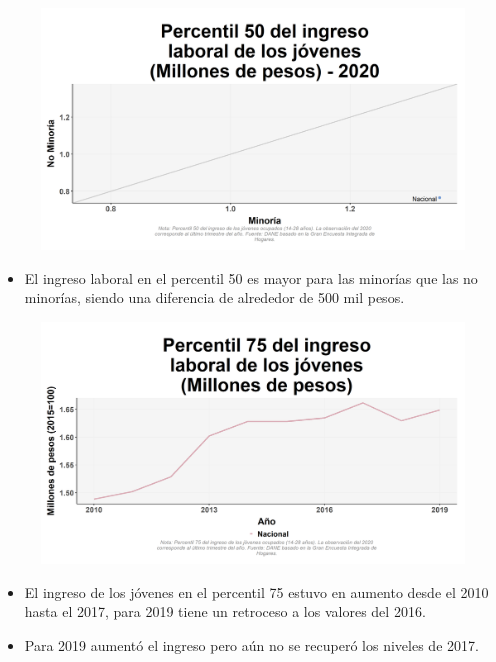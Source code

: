     \begin{figure}[H]
        \caption[Percentil 50 del ingreso laboral de los jóvenes por minorías y no minorías para 2020 ]{\label{inglab50jov_minoria_scatter} }
        \begin{center}
        \includegraphics[width=\textwidth,keepaspectratio]{img/var_21_scatter.png}
        \end{center}
    \end{figure}
            \begin{itemize}
                \item El ingreso laboral en el percentil 50 es mayor para las minorías que las no minorías, siendo una diferencia de alrededor de 500 mil pesos.
                \end{itemize}

    \begin{figure}[H]
        \caption[Percentil 75 del ingreso laboral de los jóvenes a nivel nacional ]{\label{inglab75jov_nal_trend} }
        \begin{center}
        \includegraphics[width=\textwidth,keepaspectratio]{img/var_33_trend.png}
        \end{center}
    \end{figure}
            \begin{itemize}
                \item El ingreso de los jóvenes en el percentil 75 estuvo en aumento desde el 2010 hasta el 2017, para 2019 tiene un retroceso a los valores del 2016.
                \item Para 2019 aumentó el ingreso pero aún no se recuperó los niveles de 2017.
                \end{itemize}

